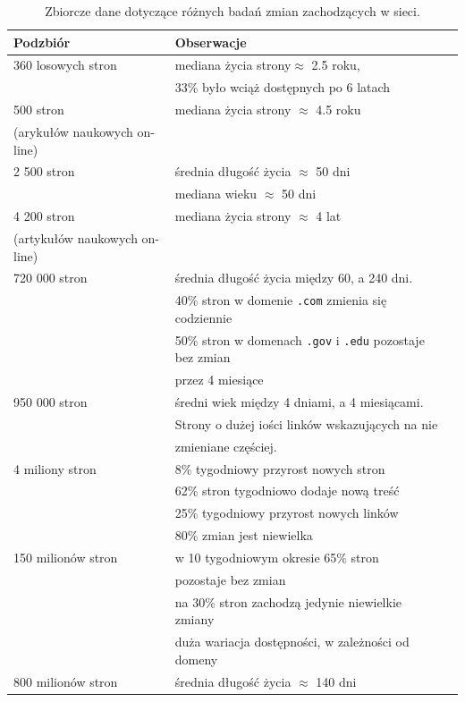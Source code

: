 \begin{table}[!h]
\caption{Zbiorcze dane dotyczące różnych badań zmian zachodzących w sieci.}
\begin{tabular}{llr}
\hline
\cline{1-2}
Podzbiór    & Obserwacje \\
\hline
360 losowych stron & mediana życia strony\(\approx\) 2.5 roku, \\
&33\% było wciąż dostępnych po 6 latach \\
\hline
500 stron & mediana życia strony \(\approx\) 4.5 roku \\
(arykułów naukowych on-line)&\\
\hline
2 500 stron & średnia długość życia \(\approx\) 50 dni \\
& mediana wieku \(\approx\) 50 dni \\
\hline
4 200 stron & mediana życia strony \(\approx\) 4 lat \\
(artykułów naukowych on-line) &\\
\hline
720 000 stron & średnia długość życia między 60, a 240 dni.\\
& 40\% stron w domenie \texttt{.com} zmienia się codziennie \\
& 50\% stron w domenach \texttt{.gov} i \texttt{.edu} pozostaje bez zmian\\
& przez 4 miesiące \\
\hline
950 000 stron & średni wiek między 4 dniami, a 4 miesiącami.\\
& Strony o dużej iości linków wskazujących na nie\\
& zmieniane częściej.\\
\hline
4 miliony stron & 8\% tygodniowy przyrost nowych stron\\
& 62\% stron tygodniowo dodaje nową treść\\
& 25\% tygodniowy przyrost nowych linków\\
& 80\% zmian jest niewielka\\
\hline
150 milionów stron & w 10 tygodniowym okresie 65\% stron\\
&pozostaje bez zmian\\
& na 30\% stron zachodzą jedynie niewielkie zmiany\\
& duża wariacja dostępności, w zależności od domeny\\
\hline
800 milionów stron & średnia długość życia \(\approx\) 140 dni\\
\hline
\end{tabular} 
\end{table}

